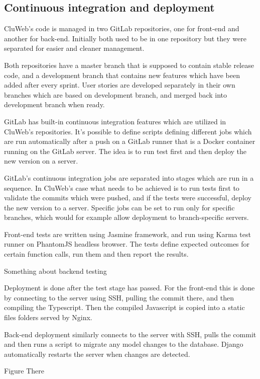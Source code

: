 \subsection{Continuous integration and deployment}
CluWeb's code is managed in two GitLab repositories, one for front-end and another for back-end. Initially both used to be in one repository but they were separated for easier and cleaner management.

Both repositories have a master branch that is supposed to contain stable release code, and a development branch that contains new features which have been added after every sprint. User stories are developed separately in their own branches which are based on development branch, and merged back into development branch when ready.

GitLab has built-in continuous integration features which are utilized in CluWeb's repositories. It's possible to define scripts defining different jobs which are run automatically after a push on a GitLab runner that is a Docker container running on the GitLab server. The idea is to run test first and then deploy the new version on a server.

GitLab's continuous integration jobs are separated into stages which are run in a sequence. In CluWeb's case what needs to be achieved is to run tests first to validate the commits which were pushed, and if the tests were successful, deploy the new version to a server. Specific jobs can be set to run only for specific branches, which would for example allow deployment to branch-specific servers.

Front-end tests are written using Jasmine framework, and run using Karma test runner on PhantomJS headless browser. The tests define expected outcomes for certain function calls, run them and then report the results.

Something about backend testing

Deployment is done after the test stage has passed. For the front-end this is done by connecting to the server using SSH, pulling the commit there, and then compiling the Typescript. Then the compiled Javascript is copied into a static files folders served by Nginx.

Back-end deployment similarly connects to the server with SSH, pulls the commit and then runs a script to migrate any model changes to the database. Django automatically restarts the server when changes are detected.

Figure There

